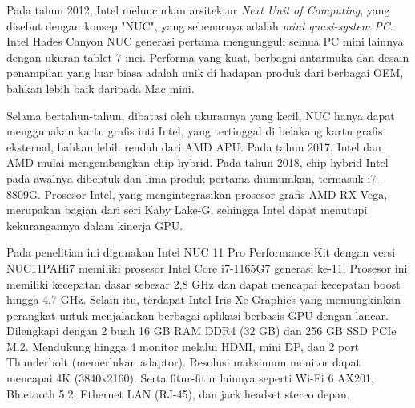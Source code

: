 Pada tahun 2012, Intel meluncurkan arsitektur \textit{Next Unit of Computing}, yang disebut dengan konsep "NUC", yang sebenarnya adalah \textit{mini quasi-system PC}. Intel Hades Canyon NUC generasi pertama mengungguli semua PC mini lainnya dengan ukuran tablet 7 inci. Performa yang kuat, berbagai antarmuka dan desain penampilan yang luar biasa adalah unik di hadapan produk dari berbagai OEM, bahkan lebih baik daripada Mac mini\parencite{8858650}.

Selama bertahun-tahun, dibatasi oleh ukurannya yang kecil, NUC hanya dapat menggunakan kartu grafis inti Intel, yang tertinggal di belakang kartu grafis eksternal, bahkan lebih rendah dari AMD APU. Pada tahun 2017, Intel dan AMD mulai mengembangkan chip hybrid. Pada tahun 2018, chip hybrid Intel pada awalnya dibentuk dan lima produk pertama diumumkan, termasuk i7-8809G. Prosesor Intel, yang mengintegrasikan prosesor grafis AMD RX Vega, merupakan bagian dari seri Kaby Lake-G, sehingga Intel dapat menutupi kekurangannya dalam kinerja GPU\parencite{8858650}.

Pada penelitian ini digunakan Intel NUC 11 Pro Performance Kit dengan versi NUC11PAHi7 memiliki prosesor Intel Core i7-1165G7 generasi ke-11. Prosesor ini memiliki kecepatan dasar sebesar 2,8 GHz dan dapat mencapai kecepatan boost hingga 4,7 GHz. Selain itu, terdapat Intel Iris Xe Graphics yang memungkinkan perangkat untuk menjalankan berbagai aplikasi berbasis GPU dengan lancar. Dilengkapi dengan 2 buah 16 GB RAM DDR4 (32 GB) dan 256 GB SSD PCIe M.2. Mendukung hingga 4 monitor melalui HDMI, mini DP, dan 2 port Thunderbolt (memerlukan adaptor). Resolusi maksimum monitor dapat mencapai 4K (3840x2160). Serta fitur-fitur lainnya seperti Wi-Fi 6 AX201, Bluetooth 5.2, Ethernet LAN (RJ-45), dan jack headset stereo depan.